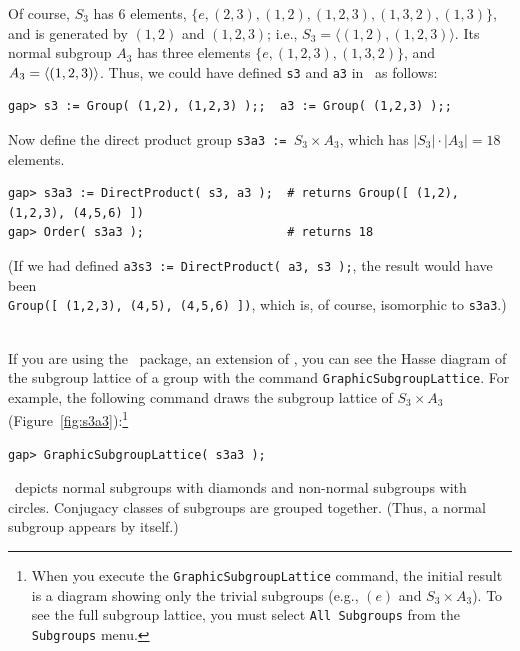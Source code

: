 \begin{enumerate}
{\begin{verbatim}
\end{verbatim}}
\noindent Of course, $S_3$ has 6 elements, 
$\{ e, (2,3), (1,2), (1,2,3), (1,3,2), (1,3) \}$, 
and is generated by $(1,2)$ and $(1,2,3)$; i.e., $S_3 = \langle (1,2),
(1,2,3)\rangle$.
Its normal subgroup $A_3$ has three elements $\{ e, (1,2,3), (1,3,2)\}$, and
$A_3 = \langle(1,2,3)\rangle$.   Thus, we could have defined {\tt s3} and 
{\tt a3} in \gap\ as follows:
{\codesize
\begin{verbatim}
gap> s3 := Group( (1,2), (1,2,3) );;  a3 := Group( (1,2,3) );;

\end{verbatim}}
\noindent Now define the direct product group {\tt s3a3 := $S_3 \times A_3$}, which has 
$|S_3|\cdot |A_3| = 18$ elements.
{\codesize
\begin{verbatim}
gap> s3a3 := DirectProduct( s3, a3 );  # returns Group([ (1,2), (1,2,3), (4,5,6) ])
gap> Order( s3a3 );                    # returns 18
\end{verbatim}
\noindent (If we had defined {\tt a3s3 := DirectProduct( a3, s3 );}, the result
would have been \\
{\tt Group([ (1,2,3), (4,5), (4,5,6) ])}, which is, of course, isomorphic to
{\tt s3a3}.)}
\\[5pt]
\noindent If you are using the \xgap\ package, an extension of \gap, you can see the
Hasse diagram of the subgroup lattice of a group with the command 
{\tt GraphicSubgroupLattice}.
For example, the following command draws the subgroup lattice of $S_3 \times A_3$
(Figure~\ref{fig:s3a3}):\footnote{When you execute the 
{\tt GraphicSubgroupLattice} command, the initial result is a
diagram showing only the trivial subgroups (e.g., $(e)$ and $S_3\times A_3$).  
To see the full subgroup lattice, you must select {\tt All Subgroups} from the 
{\tt Subgroups} menu.} 
{\codesize
\begin{verbatim}
gap> GraphicSubgroupLattice( s3a3 );

\end{verbatim}}
\noindent \xgap\ depicts normal subgroups with diamonds and non-normal subgroups with circles.  
Conjugacy classes of subgroups are grouped together.
(Thus, a normal subgroup appears by itself.)


\end{enumerate}
